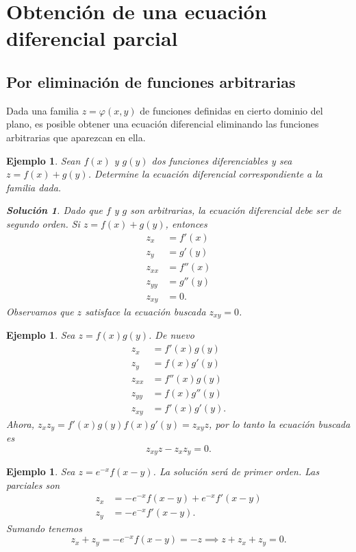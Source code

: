 \documentclass[11pt,letterpaper]{report}
\newtheorem{example}[defn]{Ejemplo}
\newtheorem*{sol}{Solución}
\newcommand\<{\langle}
\renewcommand\>{\rangle}
\renewcommand\phi\varphi
\begin{document}
\section{Obtención de una ecuación diferencial parcial}

\subsection{Por eliminación de funciones arbitrarias}

Dada una familia $z = \phi(x,y)$ de funciones definidas en
cierto dominio del plano, es posible obtener una ecuación
diferencial eliminando las funciones arbitrarias que
aparezcan en ella.

\begin{example}
  Sean $f(x)$ y $g(y)$ dos funciones diferenciables y sea $z
  = f(x) + g(y)$. Determine la ecuación diferencial
  correspondiente a la familia dada.

  \begin{sol}
    Dado que $f$ y $g$ son arbitrarias, la ecuación
    diferencial debe ser de segundo orden. Si $z = f(x) +
    g(y)$, entonces
     \begin{align*}
       z_x &= f'(x)\\
       z_y &= g'(y)\\
       z_{xx} &= f''(x)\\
       z_{yy} &= g''(y)\\
       z_{xy} &= 0.
    \end{align*} Observamos que $z$ satisface la ecuación
    buscada $z_{xy} = 0$.
  \end{sol}
\end{example}

\begin{example}
  Sea $z = f(x)g(y)$. De nuevo
  \begin{align*}
    z_x &= f'(x)g(y)\\
    z_y &= f(x)g'(y)\\
    z_{xx} &= f''(x)g(y)\\
    z_{yy} &= f(x)g''(y)\\
    z_{xy} &= f'(x)g'(y).
  \end{align*}
  Ahora, $z_x z_y = f'(x)g(y)f(x)g'(y) = z_{xy} z$, por lo
  tanto la ecuación buscada es
  \[
    z_{xy} z - z_x z_y = 0.
  \] 
\end{example}

\begin{example}
  Sea $z = e^{-x} f(x-y)$. La solución será de primer orden.
  Las parciales son
  \begin{align*}
    z_x &= -e^{-x} f(x-y) + e^{-x} f'(x-y)\\
    z_y &= -e^{-x} f'(x-y).
  \end{align*} Sumando tenemos
  \[
    z_x + z_y = -e^{-x} f(x-y) = -z \implies z + z_x + z_y =
    0.
  \] 
\end{example}
\end{document}
